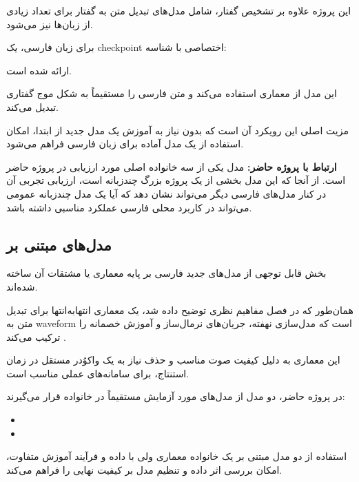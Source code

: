 این پروژه علاوه بر تشخیص گفتار، شامل مدل‌های
تبدیل متن به گفتار برای تعداد زیادی از زبان‌ها نیز می‌شود.

برای زبان فارسی، یک checkpoint اختصاصی با شناسه:

\begin{center}
\end{center}

ارائه شده است.

این مدل از معماری
استفاده می‌کند و متن فارسی را مستقیماً به شکل موج گفتاری
تبدیل می‌کند.

مزیت اصلی این رویکرد آن است که بدون نیاز به آموزش یک مدل
جدید از ابتدا، امکان استفاده از یک مدل آماده برای زبان فارسی
فراهم می‌شود.

\textbf{ارتباط با پروژه حاضر:}
مدل  یکی از سه خانواده اصلی  مورد ارزیابی در پروژه
حاضر است.
از آنجا که این مدل بخشی از یک پروژه بزرگ چندزبانه است،
ارزیابی تجربی آن در کنار مدل‌های فارسی دیگر می‌تواند نشان
دهد که آیا یک مدل چندزبانه عمومی می‌تواند در کاربرد محلی
فارسی عملکرد مناسبی داشته باشد.


\subsection{مدل‌های مبتنی بر }

بخش قابل توجهی از مدل‌های جدید  فارسی بر پایه معماری
 یا مشتقات آن ساخته شده‌اند.

همان‌طور که در فصل مفاهیم نظری توضیح داده شد،  یک
معماری انتهابه‌انتها برای تبدیل متن به waveform است که
مدل‌سازی نهفته، جریان‌های نرمال‌ساز و آموزش خصمانه را
ترکیب می‌کند
\cite{kim2021vits}.

این معماری به دلیل کیفیت صوت مناسب و حذف نیاز به یک
واکوُدر مستقل در زمان استنتاج، برای سامانه‌های عملی مناسب
است.

در پروژه حاضر، دو مدل از مدل‌های مورد آزمایش مستقیماً در
خانواده  قرار می‌گیرند:

\begin{itemize}

    \item {}
    \item {}

\end{itemize}

استفاده از دو مدل مبتنی بر یک خانواده معماری ولی با
داده و فرآیند آموزش متفاوت، امکان بررسی اثر داده و تنظیم
مدل بر کیفیت نهایی را فراهم می‌کند.


